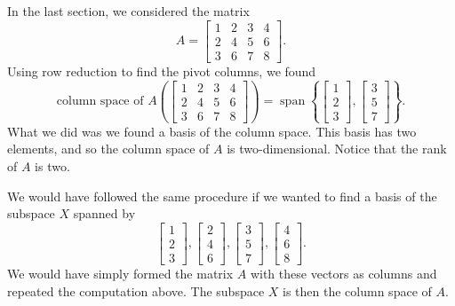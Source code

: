 \begin{example}
In the last section, we considered the matrix
\begin{equation*}
A =
\begin{bmatrix}
1 & 2 & 3 & 4 \\
2 & 4 & 5 & 6 \\
3 & 6 & 7 & 8
\end{bmatrix} .
\end{equation*}
Using row reduction to find the pivot columns, we found
\begin{equation*}
\text{column space of $A$} \left(
\begin{bmatrix}
1 & 2 & 3 & 4 \\
2 & 4 & 5 & 6 \\
3 & 6 & 7 & 8
\end{bmatrix} 
\right)
=
\operatorname{span}
\left\{
\begin{bmatrix}
1 \\
2 \\
3 
\end{bmatrix} 
,
\begin{bmatrix}
3 \\
5 \\
7 
\end{bmatrix} 
\right\} .
\end{equation*}
What we did was we found a basis of the column space.
This basis has two elements, and so the column space of $A$ is two-dimensional.
Notice that the rank of $A$ is two.
\end{example}

We would have followed the same procedure if we wanted to find a basis of
the subspace $X$ spanned by
\begin{equation*}
\begin{bmatrix}
1 \\
2 \\
3 
\end{bmatrix} 
,
\begin{bmatrix}
2 \\
4 \\
6 
\end{bmatrix} 
,
\begin{bmatrix}
3 \\
5 \\
7 
\end{bmatrix} 
,
\begin{bmatrix}
4 \\
6 \\
8 
\end{bmatrix}
.
\end{equation*}
We would have simply formed the matrix $A$ with these vectors as columns
and repeated the computation above.  The subspace $X$ is then the column space of
$A$.

